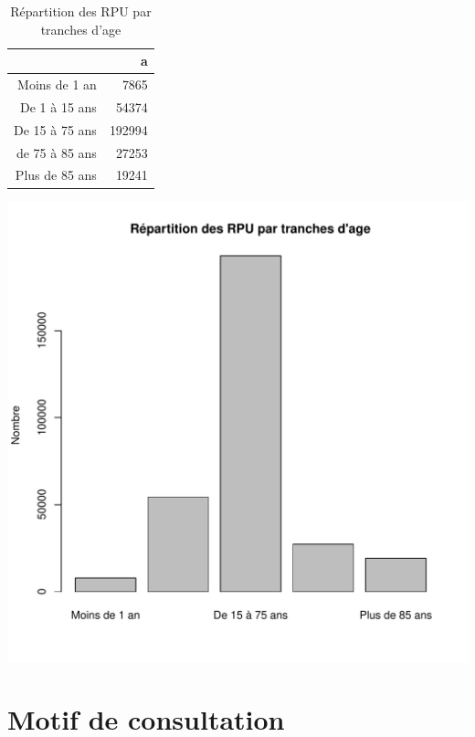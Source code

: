 \documentclass[12pt,english,french,twoside]{report}\usepackage[]{graphicx}\usepackage[]{color}
\makeatletter
\def\maxwidth{ %
  \ifdim\Gin@nat@width>\linewidth
    \linewidth
  \else
    \Gin@nat@width
  \fi
}
\makeatother
\begin{document}

\begin{table}[ht]
\centering
\begin{tabular}{rr}
  \hline
 & a \\ 
  \hline
Moins de 1 an & 7865 \\ 
  De 1 à 15 ans & 54374 \\ 
  De 15 à 75 ans & 192994 \\ 
  de 75 à 85 ans & 27253 \\ 
  Plus de 85 ans & 19241 \\ 
   \hline
\end{tabular}
\caption[Répartition des RPU par tranches d'age]{Répartition des RPU par tranches d'age} 
\label{tab:tranche}
\end{table}

\includegraphics[width=\maxwidth]{figure/tranche} 




\newpage
\chapter{Motif de consultation}


\end{document}

